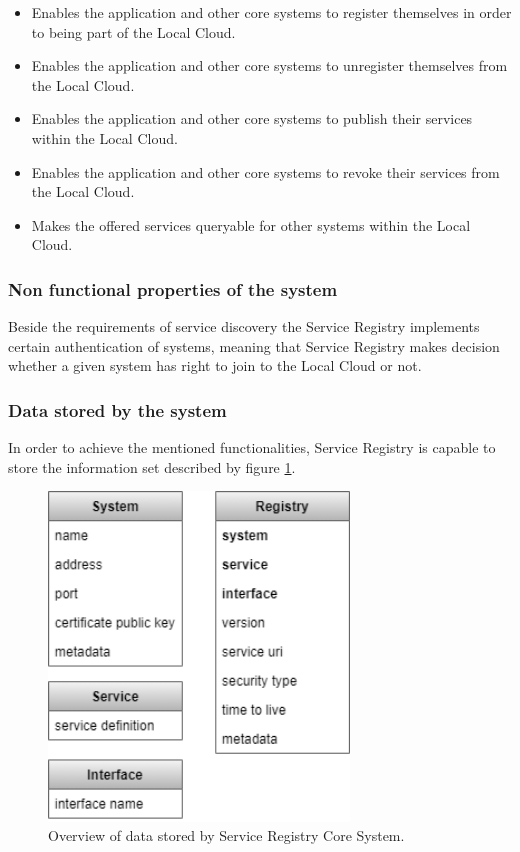 \documentclass[a4paper]{arrowhead}
\begin{document}
\begin{itemize}
    \item Enables the application and other core systems to register themselves in order to being part of the Local Cloud.
    \item Enables the application and other core systems to unregister themselves from the Local Cloud.
    \item Enables the application and other core systems to publish their services within the Local Cloud.
    \item Enables the application and other core systems to revoke their services from the Local Cloud.
    \item Makes the offered services queryable for other systems within the Local Cloud.
\end{itemize}

\subsubsection {Non functional properties of the system}
Beside the requirements of service discovery the Service Registry implements certain authentication of systems, meaning that Service Registry makes decision whether a given system has right to join to the Local Cloud or not.

\subsubsection {Data stored by the system}
In order to achieve the mentioned functionalities, Service Registry is capable to store the information set described by figure \ref{fig:information_overview}.

\begin{figure}[h!]
  \centering
  \includegraphics[width=8cm]{figures/serviceregistry_data_overview.png}
  \caption{
    Overview of data stored by Service Registry Core System.
  }
  \label{fig:information_overview}
\end{figure}
\end{document}
